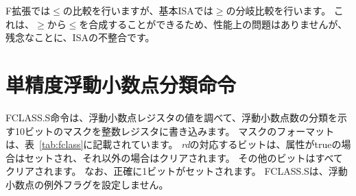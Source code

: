 {\begin{commentary}
\begin{comment}
The F extension provides a $\leq$ comparison, whereas the base ISA provides
a $\geq$ branch comparison.  Because $\leq$ can be synthesized from $\geq$ and
vice-versa, there is no performance implication to this inconsistency, but it
is nevertheless an unfortunate incongruity in the ISA.
\end{comment}

F拡張では$\leq$の比較を行いますが、基本ISAでは$\geq$の分岐比較を行います。 
これは、$\geq$から$\leq$を合成することができるため、性能上の問題はありませんが、残念なことに、ISAの不整合です。
\end{commentary}

\begin{comment}
\section{Single-Precision Floating-Point Classify Instruction}
\end{comment}
\section{単精度浮動小数点分類命令}

\begin{comment}
The FCLASS.S instruction examines the value in floating-point register {\em
rs1} and writes to integer register {\em rd} a 10-bit mask that indicates
the class of the floating-point number.  The format of the mask is
described in Table~\ref{tab:fclass}.  The corresponding bit in {\em rd} will
be set if the property is true and clear otherwise.  All other bits in
{\em rd} are cleared.  Note that exactly one bit in {\em rd} will be set.
FCLASS.S does not set the floating-point exception flags.
\end{comment}

FCLASS.S命令は、浮動小数点レジスタの値を調べて、浮動小数点数の分類を示す10ビットのマスクを整数レジスタに書き込みます。
マスクのフォーマットは、表~\ref{tab:fclass}に記載されています。
{\em rd}の対応するビットは、属性がtrueの場合はセットされ、それ以外の場合はクリアされます。
その他のビットはすべてクリアされます。 なお、正確に1ビットがセットされます。
FCLASS.Sは、浮動小数点の例外フラグを設定しません。

}
